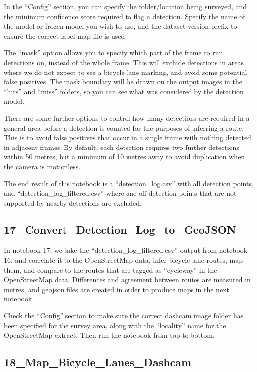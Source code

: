 \documentclass[11pt,twoside]{report}
\begin{document}
In the ``Config'' section, you can specify the folder/location being surveyed, and the minimum confidence score required to flag a detection.  Specify the name of the model or frozen model you wish to use, and the dataset version prefix to ensure the correct label map file is used.

The ``mask'' option allows you to specify which part of the frame to run detections on, instead of the whole frame.  This will exclude detections in areas where we do not expect to see a bicycle lane marking, and avoid some potential false positives.  The mask boundary will be drawn on the output images in the ``hits'' and ``miss'' folders, so you can see what was considered by the detection model.

There are some further options to control how many detections are required in a general area before a detection is counted for the purposes of inferring a route.  This is to avoid false positives that occur in a single frame with nothing detected in adjacent frames.  By default, each detection requires two further detections within 50 metres, but a minimum of 10 metres away to avoid duplication when the camera is motionless.

The end result of this notebook is a ``detection\_log.csv'' with all detection points, and ``detection\_log\_filtered.csv'' where one-off detection points that are not supported by nearby detections are excluded.


\subsection{17\_Convert\_Detection\_Log\_to\_GeoJSON}
\label{a17}

In notebook 17, we take the ``detection\_log\_filtered.csv'' output from notebook 16, and correlate it to the OpenStreetMap data, infer bicycle lane routes, map them, and compare to the routes that are tagged as ``cycleway'' in the OpenStreetMap data.  Differences and agreement between routes are measured in metres, and geojson files are created in order to produce maps in the next notebook.

Check the ``Config'' section to make sure the correct dashcam image folder has been specified for the survey area, along with the ``locality'' name for the OpenStreetMap extract.  Then run the notebook from top to bottom.


\subsection{18\_Map\_Bicycle\_Lanes\_Dashcam}
\label{a18}
\end{document}
